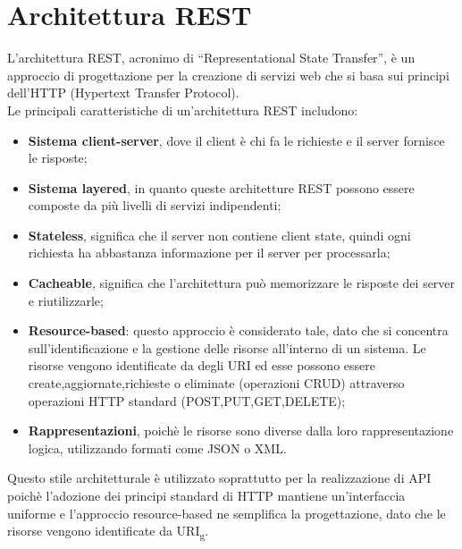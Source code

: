 \section{Architettura REST}
L’architettura REST, acronimo di “Representational State Transfer”, è un approccio di progettazione per la creazione di servizi web che si basa sui principi dell’HTTP (Hypertext Transfer Protocol).\\
Le principali caratteristiche di un’architettura REST includono:
\begin{itemize}
\item \textbf{Sistema client-server}, dove il client è chi fa le richieste e il server fornisce le risposte;
\item \textbf{Sistema layered}, in quanto queste architetture REST possono essere composte da più livelli di servizi indipendenti;
\item \textbf{Stateless}, significa che il server non contiene client state, quindi ogni richiesta ha abbastanza informazione per il server per processarla;
\item \textbf{Cacheable}, significa che l’architettura può memorizzare le risposte dei server e riutilizzarle;
\item \textbf{Resource-based}: questo approccio è considerato tale, dato che si concentra sull’identificazione e la gestione delle risorse all’interno di un sistema. Le risorse vengono identificate da degli URI ed esse possono essere create,aggiornate,richieste o eliminate (operazioni CRUD) attraverso operazioni HTTP standard (POST,PUT,GET,DELETE);
\item \textbf{Rappresentazioni}, poichè le risorse sono diverse dalla loro rappresentazione logica, utilizzando formati come JSON o XML.
\end{itemize}
Questo stile architetturale è utilizzato soprattutto per la realizzazione di API poichè l'adozione dei principi standard di HTTP mantiene un'interfaccia uniforme e l'approccio resource-based ne semplifica la progettazione, dato che le risorse vengono identificate da URI\textsubscript{g}.

